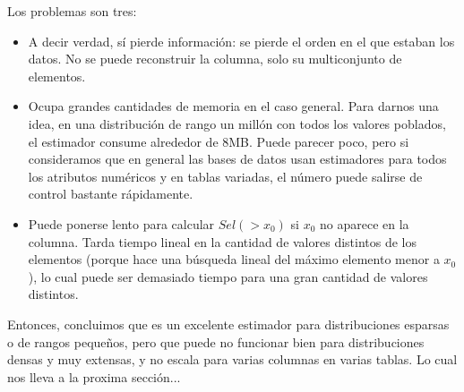 Los problemas son tres:
\begin{itemize}
 \item A decir verdad, sí pierde información: se pierde el orden en el que estaban los datos. No se puede reconstruir la columna, solo su multiconjunto de elementos.
 \item Ocupa grandes cantidades de memoria en el caso general. Para darnos una idea, en una distribución de rango un millón con todos los valores poblados, el estimador consume alrededor de 8MB. Puede parecer poco, pero si consideramos que en general las bases de datos usan estimadores para todos los atributos numéricos y en tablas variadas, el número puede salirse de control bastante rápidamente.
 \item Puede ponerse lento para calcular $Sel(>x_0)$ si $x_0$ no aparece en la columna. Tarda tiempo lineal en la cantidad de valores distintos de los elementos (porque hace una búsqueda lineal del máximo elemento menor a $x_0$), lo cual puede ser demasiado tiempo para una gran cantidad de valores distintos.
\end{itemize}

Entonces, concluimos que es un excelente estimador para distribuciones esparsas o de rangos pequeños, pero que puede no funcionar bien para distribuciones densas y muy extensas, y no escala para varias columnas en varias tablas. Lo cual nos lleva a la proxima sección...

